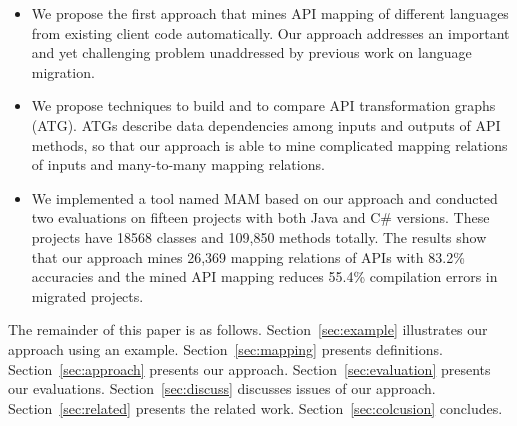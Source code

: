 \begin{itemize}\vspace*{-1.5ex}
\item We propose the first approach that mines API mapping of
different languages from existing client code automatically. Our
approach addresses an important and yet challenging problem
unaddressed by previous work on language migration.\vspace*{-1.5ex}
\item We propose techniques to build and to compare API
transformation graphs (ATG). ATGs describe data dependencies among
inputs and outputs of API methods, so that our approach is able to
mine complicated mapping relations of inputs and many-to-many
mapping relations.\vspace*{-1.5ex}
\item We
implemented a tool named MAM based on our approach and conducted two
evaluations on fifteen projects with both Java and C\# versions.
These projects have 18568 classes and 109,850 methods totally. The
results show that our approach mines 26,369 mapping relations of
APIs with 83.2\% accuracies and the mined API mapping reduces 55.4\%
compilation errors in migrated projects.
\end{itemize}\vspace*{-1.5ex}


The remainder of this paper is as follows. Section~\ref{sec:example}
illustrates our approach using an example. Section~\ref{sec:mapping}
presents definitions. Section~\ref{sec:approach} presents our
approach. Section~\ref{sec:evaluation} presents our evaluations.
Section~\ref{sec:discuss} discusses issues of our approach.
Section~\ref{sec:related} presents the related work.
Section~\ref{sec:colcusion} concludes.
